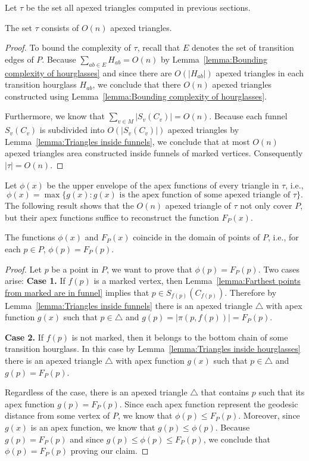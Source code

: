 \documentclass[a4paper,UKenglish]{lipics}
\newcommand{\F}[2]{\ensuremath{F_{\scriptscriptstyle #1}(#2)}}
\newcommand{\fn}[2]{\ensuremath{S_{\scriptscriptstyle #1}(#2)}}
\newcommand{\ff}[1]{\ensuremath{f(#1)}}
\newcommand{\g}[2]{\ensuremath{|\pi(#1, #2)|}}
\begin{document}
Let $\tau$ be the set all apexed triangles computed in previous sections. 

\begin{lemma}\label{lemma:Size of tau}
The set $\tau$ consists of $O(n)$ apexed triangles.
\end{lemma}
\begin{proof}
To bound the complexity of $\tau$, recall that $E$ denotes the set of transition edges of $P$.
Because $\sum_{ab\in E} H_{ab} = O(n)$ by Lemma~\ref{lemma:Bounding complexity of hourglasses} and since there are $O(|H_{ab}|)$ apexed triangles in each transition hourglass $H_{ab}$, we conclude that there $O(n)$ apexed triangles constructed using Lemma~\ref{lemma:Bounding complexity of hourglasses}.

Furthermore, we know that $\sum_{v\in M} |\fn{v}{C_v}| = O(n)$. Because each funnel $\fn{v}{C_v}$ is subdivided into $O(|\fn{v}{C_v}|)$ apexed triangles by Lemma~\ref{lemma:Triangles inside funnels}, we conclude that at most $O(n)$ apexed triangles area constructed inside funnels of marked vertices. Consequently $|\tau| = O(n)$.
\end{proof}




Let $\phi(x)$ be the upper envelope of the apex functions of every triangle in $\tau$, i.e., $$\phi(x) = \max\{g(x) : g(x)\text{ is the apex function of some apexed triangle of }\tau\}.$$
The following result shows that the $O(n)$ apexed triangle of $\tau$ not only cover $P$, but their apex functions suffice to reconstruct the function $\F{P}{x}$.

\begin{lemma}\label{lemma:Optimization problem same as geodesic center}
The functions $\phi(x)$ and $\F{P}{x}$ coincide in the domain of points of $P$, i.e., for each $p\in P$, $\phi(p) = \F{P}{p}$.
\end{lemma}
\begin{proof}
Let $p$ be a point in $P$, we want to prove that $\phi(p) = \F{P}{p}$. 
Two cases arise: 
\textbf{Case 1.} If $\ff{p}$ is a marked vertex, then Lemma~\ref{lemma:Farthest points from marked are in funnel} implies that $p\in \fn{\ff{p}}{C_{\ff{p}}}$. Therefore
by Lemma~\ref{lemma:Triangles inside funnels} there is an apexed triangle $\triangle$ with apex function $g(x)$ such that $p\in \triangle$ and $g(p) = \g{p}{\ff{p}} = \F{P}{p}$.

\textbf{Case 2.} If $\ff{p}$ is not marked, then it belongs to the bottom chain of some transition hourglass. In this case by Lemma~\ref{lemma:Triangles inside hourglasses} there is an apexed triangle $\triangle$ with apex function $g(x)$ such that $p\in \triangle$ and $g(p) = \F{P}{p}$.

Regardless of the case, there is an apexed triangle $\triangle$ that contains $p$ such that its apex function $g(p) = \F{P}{p}$.
Since each apex function represent the geodesic distance from some vertex of $P$, we know that $\phi(p) \leq \F{P}{p}$. Moreover, since $g(x)$ is an apex function, we know that $g(p) \leq \phi(p)$.
Because $g(p) = \F{P}{p}$ and since $g(p) \leq \phi(p) \leq  \F{P}{p}$, we conclude that $\phi(p) = \F{P}{p}$ proving our claim.
\end{proof}
\end{document}
